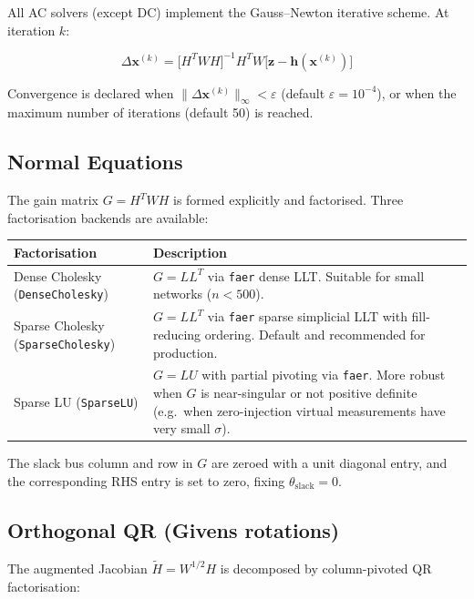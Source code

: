 \documentclass[11pt,a4paper]{article}
\begin{document}
All AC solvers (except DC) implement the Gauss--Newton iterative scheme.
At iteration $k$:

\begin{equation}\label{eq:gn}
  \Delta\mathbf{x}^{(k)} = \bigl[H^T W H\bigr]^{-1} H^T W
  \bigl[\mathbf{z} - \mathbf{h}(\mathbf{x}^{(k)})\bigr]
\end{equation}

\noindent
Convergence is declared when
$\|\Delta\mathbf{x}^{(k)}\|_\infty < \varepsilon$ (default
$\varepsilon = 10^{-4}$), or when the maximum number of iterations
(default 50) is reached.

\subsection{Normal Equations}\label{sec:ne}

The gain matrix $G = H^T W H$ is formed explicitly and factorised.
Three factorisation backends are available:

\begin{center}
\small
\begin{tabular}{lp{65mm}}
  \toprule
  \textbf{Factorisation} & \textbf{Description} \\
  \midrule
  Dense Cholesky (\texttt{DenseCholesky})
    & $G = LL^T$ via \texttt{faer} dense LLT.  Suitable for small networks
      ($n < 500$). \\
  Sparse Cholesky (\texttt{SparseCholesky})
    & $G = LL^T$ via \texttt{faer} sparse simplicial LLT with fill-reducing
      ordering.  Default and recommended for production. \\
  Sparse LU (\texttt{SparseLU})
    & $G = LU$ with partial pivoting via \texttt{faer}.  More robust when
      $G$ is near-singular or not positive definite (e.g.\ when zero-injection
      virtual measurements have very small $\sigma$). \\
  \bottomrule
\end{tabular}
\end{center}

\noindent
The slack bus column and row in $G$ are zeroed with a unit diagonal entry,
and the corresponding RHS entry is set to zero, fixing $\theta_\text{slack} = 0$.

\subsection{Orthogonal QR (Givens rotations)}\label{sec:qr}

The augmented Jacobian $\tilde{H} = W^{1/2}H$ is decomposed by
column-pivoted QR factorisation:
\end{document}
